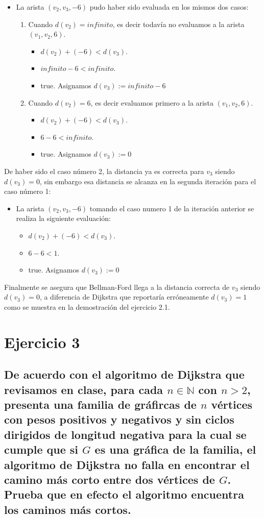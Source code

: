 \documentclass[12pt]{article}
\begin{document}
\begin{itemize}
\begin{enumerate}
	\end{enumerate}
		\item La arista $(v_2, v_3, -6)$ pudo haber sido evaluada en los mismos dos casos:
		\begin{enumerate}
			 \item Cuando $d(v_2)=infinito$, es decir todavía no evaluamos a la arista $(v_1, v_2, 6)$.
			 \begin{itemize}
			 	\item $d(v_2) + (-6) < d(v_3)$.
			 	\item $infinito - 6 < infinito$.
			 	\item true. Asignamos $d(v_3) := infinito - 6$
			 \end{itemize}
			 \item Cuando $d(v_2)=6$, es decir evaluamos primero a la arista $(v_1, v_2, 6)$.
			 \begin{itemize}
			 	\item $d(v_2) + (-6) < d(v_3)$.
			 	\item $6 - 6 < infinito$.
			 	\item true. Asignamos $d(v_3) := 0$
			 \end{itemize}
		\end{enumerate}
	\end{itemize}
	De haber sido el caso número 2, la distancia ya es correcta para $v_3$ siendo $d(v_3)=0$, sin embargo esa distancia se alcanza en la segunda iteración para el caso número 1:
	\begin{itemize}
	\item La arista $(v_2, v_3, -6)$ tomando el caso numero 1 de la iteración anterior se realiza la siguiente evaluación:
			\begin{itemize}
				\item $d(v_2) + (-6) < d(v_3)$.
				\item $6 - 6 < 1$.
				\item true. Asignamos $d(v_3) := 0$
			\end{itemize}
	\end{itemize}
Finalmente se asegura que Bellman-Ford llega a la distancia correcta de $v_3$ siendo $d(v_3)=0$, a diferencia de Dijkstra que reportaría erróneamente $d(v_3)=1$ como se muestra en la demostración del ejercicio 2.1.
\section{Ejercicio 3}
\subsection{De acuerdo con el algoritmo de Dijkstra que revisamos en clase, para cada $n\in \mathbb{N}$ con $n>2$, presenta una familia de gráfircas de $n$ vértices con pesos positivos y negativos y sin ciclos dirigidos de longitud negativa para la cual se cumple que si $G$ es una gráfica de la familia, el algoritmo de Dijkstra no falla en encontrar el camino más corto entre dos vértices de $G$. Prueba que en efecto el algoritmo encuentra los caminos más cortos.}
\end{document}

